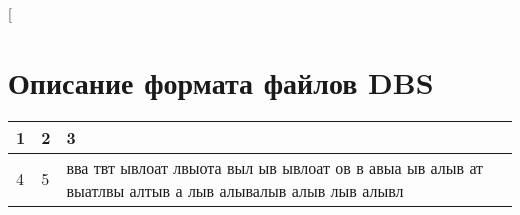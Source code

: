 [%

\chapter{
  Описание формата файлов DBS
}
\label{app:dbs}

\noindent
\begin{tabularx}{\textwidth}{|p{3em}|p{4em}|X|}
  \hline
  1 & 2 & 3 \\
  \hline
  4 & 5 & вва твт ывлоат лвыота выл ыв ывлоат ов в авыа ыв алыв ат выатлвы алтыв а лыв алывалыв алыв лыв алывл
  \\
  \hline
\end{tabularx}
